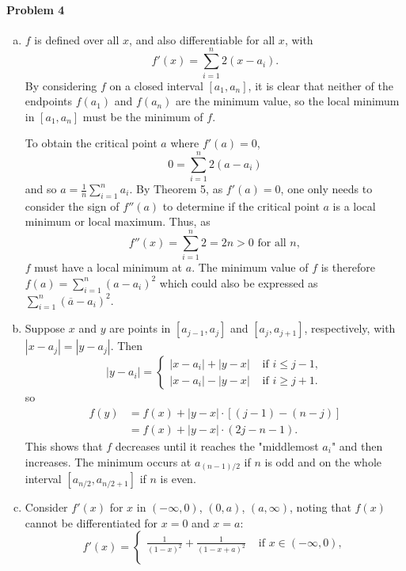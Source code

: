 \documentclass{article}
\begin{document}
\paragraph{Problem 4}
\begin{enumerate}[(a)]
  \item $f$ is defined over all $x$, and also differentiable for all $x$, with
    \[
      f'(x) = \sum_{i=1}^n 2(x - a_i).
    \] By considering $f$ on a closed interval $[a_1, a_n]$, it is clear that
    neither of the endpoints $f(a_1)$ and $f(a_n)$ are the minimum value, so
    the local minimum in $[a_1, a_n]$ must be the minimum of $f$.

    To obtain the critical point $a$ where $f'(a) = 0$, \[
      0 = \sum_{i=1}^n 2(a - a_i)
    \] and so $a = \frac{1}{n}\sum_{i=1}^n a_i$. By Theorem 5, as $f'(a) = 0$,
    one only needs to consider the sign of $f''(a)$ to determine if the
    critical point $a$ is a local minimum or local maximum. Thus, as \[
      f''(x) = \sum_{i=1}^n 2 = 2n > 0 \text{ for all } n,
    \] $f$ must have a local minimum at $a$. The minimum value of $f$ is
    therefore $f(a) = \sum_{i=1}^n (a - a_i)^2$ which could also be expressed
    as $\sum_{i=1}^n (\overline{a} - a_i)^2$.
  \item Suppose $x$ and $y$ are points in $[a_{j-1}, a_j]$ and $[a_j,
    a_{j+1}]$, respectively, with $|x - a_j| = |y - a_j|$. Then \[
      |y - a_i| =
      \begin{cases}
        |x - a_i| + |y - x| &\text{ if } i \leq j - 1, \\
        |x - a_i| - |y - x| &\text{ if } i \geq j + 1.
      \end{cases}
    \] so \begin{align*}
      f(y) &= f(x) + |y - x| \cdot [(j - 1) - (n - j)] \\
           &= f(x) + |y - x| \cdot (2j - n - 1).
    \end{align*}
    This shows that $f$ decreases until it reaches the "middlemost $a_i$" and
    then increases. The minimum occurs at $a_{(n - 1)/2}$ if $n$ is odd and on
    the whole interval $[a_{n/2}, a_{n/2 + 1}]$ if $n$ is even.
  \item Consider $f'(x)$ for $x$ in $(-\infty, 0)$, $(0, a)$, $(a, \infty)$,
    noting that $f(x)$ cannot be differentiated for $x = 0$ and $x = a$: \[
      f'(x) =
      \begin{cases}
        \frac{1}{(1 - x)^2} + \frac{1}{(1 - x + a)^2}
        &\text{ if } x \in (-\infty, 0), \\

\end{cases}\]
\end{enumerate}
\end{document}
